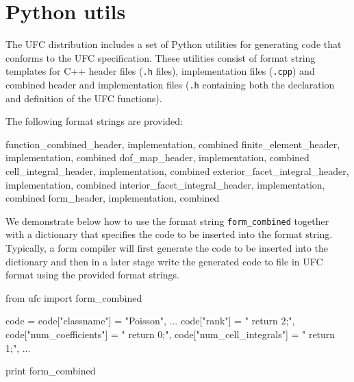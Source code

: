 \chapter{Python utils}

The UFC distribution includes a set of Python utilities for
generating code that conforms to the UFC specification. These
utilities consist of format string templates for C++ header files
(\texttt{.h} files), implementation files (\texttt{.cpp}) and combined
header and implementation files (\texttt{.h} containing both the
declaration and definition of the UFC functions).

The following format strings are provided:

\begin{code}
function_combined_{header, implementation, combined}
finite_element_{header, implementation, combined}
dof_map_{header, implementation, combined}
cell_integral_{header, implementation, combined}
exterior_facet_integral_{header, implementation, combined}
interior_facet_integral_{header, implementation, combined}
form_{header, implementation, combined}
\end{code}

We demonstrate below how to use the format string
\texttt{form\_combined} together with a dictionary that specifies the
code to be inserted into the format string. Typically, a form compiler
will first generate the code to be inserted into the dictionary and
then in a later stage write the generated code to file in UFC format
using the provided format strings.

\begin{code}
from ufc import form_combined

code = {}
code["classname"] = "Poisson",
...
code["rank"] = "    return 2;",
code["num_coefficients"] = "    return 0;",
code["num_cell_integrals"] = "    return 1;",
...

print form_combined %
\end{code}
